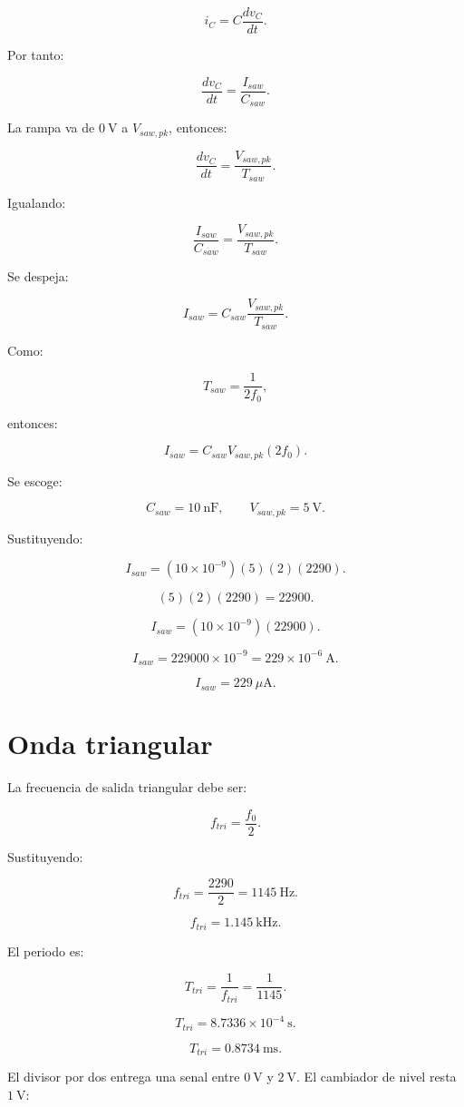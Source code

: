 \documentclass[11pt,letterpaper]{article}
\begin{document}
\[
i_C=C\frac{dv_C}{dt}.
\]

Por tanto:

\[
\frac{dv_C}{dt}=\frac{I_{saw}}{C_{saw}}.
\]

La rampa va de \(0~\text{V}\) a \(V_{saw,pk}\), entonces:

\[
\frac{dv_C}{dt}=
\frac{V_{saw,pk}}{T_{saw}}.
\]

Igualando:

\[
\frac{I_{saw}}{C_{saw}}
=
\frac{V_{saw,pk}}{T_{saw}}.
\]

Se despeja:

\[
I_{saw}=
C_{saw}\frac{V_{saw,pk}}{T_{saw}}.
\]

Como:

\[
T_{saw}=\frac{1}{2f_0},
\]

entonces:

\[
I_{saw}=C_{saw}V_{saw,pk}(2f_0).
\]

Se escoge:

\[
C_{saw}=10~\text{nF},
\qquad
V_{saw,pk}=5~\text{V}.
\]

Sustituyendo:

\[
I_{saw}
=(10\times 10^{-9})(5)(2)(2290).
\]

\[
(5)(2)(2290)=22900.
\]

\[
I_{saw}=(10\times 10^{-9})(22900).
\]

\[
I_{saw}=229000\times 10^{-9}=229\times 10^{-6}~\text{A}.
\]

\[
\boxed{I_{saw}=229~\mu\text{A}}.
\]

\section{Onda triangular}

La frecuencia de salida triangular debe ser:

\[
f_{tri}=\frac{f_0}{2}.
\]

Sustituyendo:

\[
f_{tri}=\frac{2290}{2}=1145~\text{Hz}.
\]

\[
\boxed{f_{tri}=1.145~\text{kHz}}.
\]

El periodo es:

\[
T_{tri}=\frac{1}{f_{tri}}=\frac{1}{1145}.
\]

\[
T_{tri}=8.7336\times 10^{-4}~\text{s}.
\]

\[
T_{tri}=0.8734~\text{ms}.
\]

El divisor por dos entrega una senal entre \(0~\text{V}\) y \(2~\text{V}\). El
cambiador de nivel resta \(1~\text{V}\):
\end{document}
